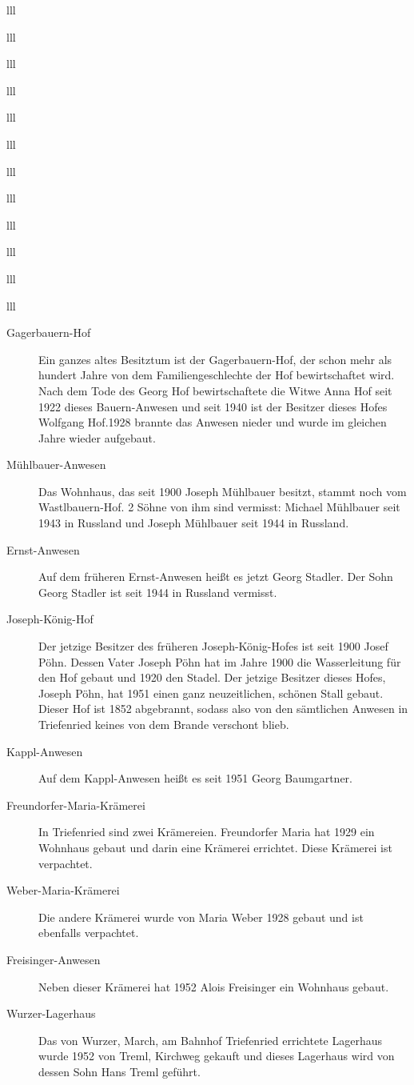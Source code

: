 \documentclass[12pt,a4pager]{book}
\begin{document}
\begin{tabuluar}{lll}
\begin{tabuluar}{lll}
\begin{tabuluar}{lll}
\begin{tabuluar}{lll}
\begin{tabuluar}{lll}
\begin{tabuluar}{lll}
\begin{tabuluar}{lll}
\begin{tabuluar}{lll}
\begin{tabuluar}{lll}
\begin{tabuluar}{lll}
\begin{tabuluar}{lll}
\begin{tabuluar}{lll}
\begin{description}
\item[Gagerbauern-Hof] Ein ganzes altes Besitztum ist der Gagerbauern-Hof, der
schon mehr als hundert Jahre von dem Familiengeschlechte der Hof bewirtschaftet
wird. Nach dem Tode des Georg Hof bewirtschaftete die Witwe Anna Hof seit 1922
dieses Bauern-Anwesen und seit 1940 ist der Besitzer dieses Hofes Wolfgang
Hof.1928 brannte das Anwesen nieder und wurde im gleichen Jahre wieder
aufgebaut.

\item[Mühlbauer-Anwesen] Das Wohnhaus, das seit 1900 Joseph Mühlbauer besitzt,
stammt noch vom Wastlbauern-Hof. 2 Söhne von ihm sind vermisst: Michael
Mühlbauer seit 1943 in Russland und Joseph Mühlbauer seit 1944 in Russland.

\item[Ernst-Anwesen] Auf dem früheren Ernst-Anwesen heißt es jetzt Georg
Stadler. Der Sohn Georg Stadler ist seit 1944 in Russland vermisst.

\item[Joseph-König-Hof] Der jetzige Besitzer des früheren Joseph-König-Hofes
ist seit 1900 Josef Pöhn. Dessen Vater Joseph Pöhn hat im Jahre 1900 die
Wasserleitung für den Hof gebaut und 1920 den Stadel. Der jetzige Besitzer
dieses Hofes, Joseph Pöhn, hat 1951 einen ganz neuzeitlichen, schönen Stall
gebaut. Dieser Hof ist 1852 abgebrannt, sodass also von den sämtlichen Anwesen
in Triefenried keines von dem Brande verschont blieb.

\item[Kappl-Anwesen] Auf dem Kappl-Anwesen heißt es seit 1951 Georg
Baumgartner.

\item[Freundorfer-Maria-Krämerei] In Triefenried sind zwei Krämereien.
Freundorfer Maria hat 1929 ein Wohnhaus gebaut und darin eine Krämerei
errichtet. Diese Krämerei ist verpachtet.

\item[Weber-Maria-Krämerei] Die andere Krämerei wurde von Maria Weber 1928
gebaut und ist ebenfalls verpachtet.

\item[Freisinger-Anwesen] Neben dieser Krämerei hat 1952 Alois Freisinger ein
Wohnhaus gebaut.

\item[Wurzer-Lagerhaus] Das von Wurzer, March, am Bahnhof Triefenried
errichtete Lagerhaus wurde 1952 von Treml, Kirchweg gekauft und dieses Lagerhaus
wird von dessen Sohn Hans Treml geführt.
\end{description}


\end{tabuluar}
\end{tabuluar}
\end{tabuluar}
\end{tabuluar}
\end{tabuluar}
\end{tabuluar}
\end{tabuluar}
\end{tabuluar}
\end{tabuluar}
\end{tabuluar}
\end{tabuluar}
\end{tabuluar}
\end{document}
